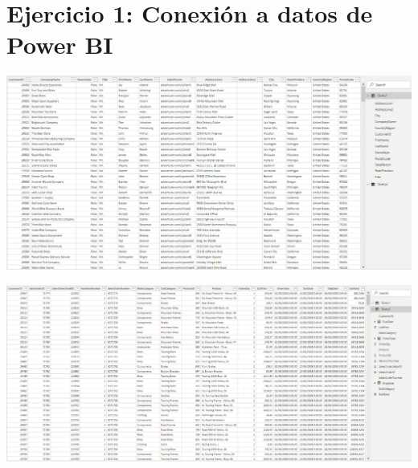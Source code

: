 \section{Ejercicio 1: Conexión a datos de Power BI} 

\begin{center}
\includegraphics[width=15cm]{./Imagenes/Captura1}
\end{center}	

\begin{center}
\includegraphics[width=15cm]{./Imagenes/Captura2}
\end{center}